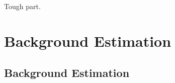 \begin{savequote}[75mm]
Tough part.
\end{savequote}

\chapter{Background Estimation}
\section{Background Estimation}
\label{sec:backgrounds}
